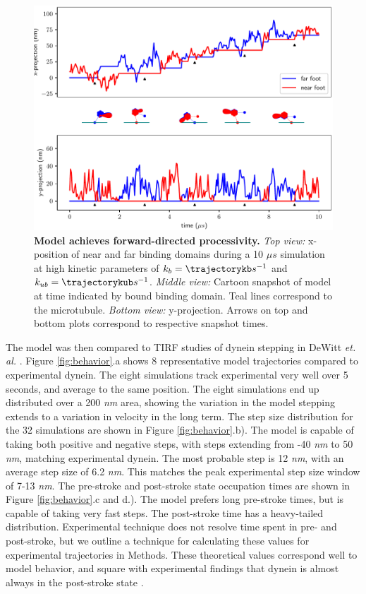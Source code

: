 \documentclass[9pt,twocolumn,twoside]{article}
\begin{document}
\begin{figure}[tbhp]
\centering
\includegraphics[width=\linewidth]{../../plots/paper_trajectory_plot.pdf}
\caption{\textbf{Model achieves forward-directed processivity.} \textit{Top view:} x-position of near and far binding domains during a 10 $\mu s$ simulation at high kinetic parameters of $k_b = \trajectorykb s^{-1}$ and $k_{ub} = \trajectorykub s^{-1}$. \textit{Middle view:} Cartoon snapshot of model at time indicated by bound binding domain. Teal lines correspond to the microtubule. \textit{Bottom view:} y-projection. Arrows on top and bottom plots correspond to respective snapshot times.}
\label{fig:trajectory}
\end{figure}

The model was then compared to TIRF studies of dynein stepping in DeWitt \textit{et. al.} \cite{yildizpaper}. Figure \ref{fig:behavior}.a shows 8 representative model trajectories compared to experimental dynein. The eight simulations track experimental very well over 5 seconds, and average to the same position. The eight simulations end up distributed over a 200 \textit{nm} area, showing the variation in the model stepping extends to a variation in velocity in the long term. The step size distribution for the 32 simulations are shown in Figure \ref{fig:behavior}.b). The model is capable of taking both positive and negative steps, with steps extending from -40 \textit{nm} to 50 \textit{nm}, matching experimental dynein. The most probable step is 12 \textit{nm}, with an average step size of 6.2 \textit{nm}. This matches the peak experimental step size window of 7-13 \textit{nm}. The pre-stroke and post-stroke state occupation times are shown in Figure \ref{fig:behavior}.c and d.). The model prefers long pre-stroke times, but is capable of taking very fast steps. The post-stroke time has a heavy-tailed distribution. Experimental technique does not resolve time spent in pre- and post-stroke, but we outline a technique for calculating these values for experimental trajectories in Methods. These theoretical values correspond well to model behavior, and square with experimental findings that dynein is almost always in the post-stroke state \cite{imaiburgess}.
\end{document}
